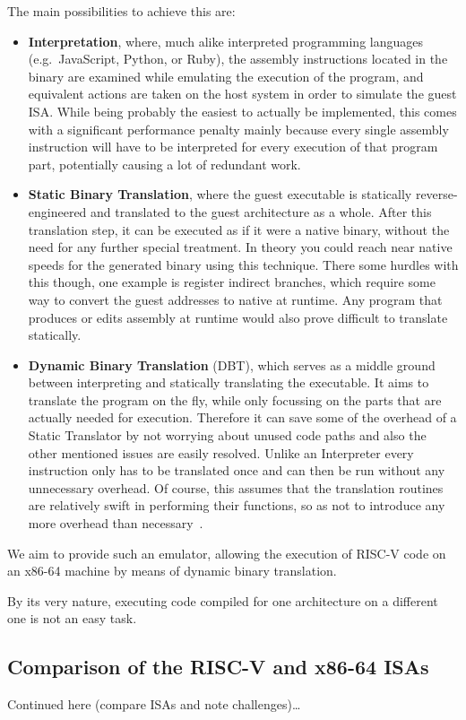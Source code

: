 The main possibilities to achieve this are:
\begin{itemize}
    \item \textbf{Interpretation}, where, much alike interpreted programming languages (e.g.\ JavaScript, Python, or Ruby), the assembly instructions located in the binary are examined while emulating the execution of the program, and equivalent actions are taken on the host system in order to simulate the guest ISA\@.
        \subitem While being probably the easiest to actually be implemented, this comes with a significant performance penalty mainly because every single assembly instruction will have to be interpreted for every execution of that program part, potentially causing a lot of redundant work.
    \item \textbf{Static Binary Translation}, where the guest executable is statically reverse-engineered and translated to the guest architecture as a whole.
    After this translation step, it can be executed as if it were a native binary, without the need for any further special treatment.
    In theory you could reach near native speeds for the generated binary using this technique.
    There some hurdles with this though, one example is register indirect branches, which require some way to convert the guest addresses to native at runtime.
    Any program that produces or edits assembly at runtime would also prove difficult to translate statically.
    \item \textbf{Dynamic Binary Translation} (DBT), which serves as a middle ground between interpreting and statically translating the executable.
    It aims to translate the program on the fly, while only focussing on the parts that are actually needed for execution.
    Therefore it can save some of the overhead of a Static Translator by not worrying about unused code paths and also the other mentioned issues are easily resolved.
    Unlike an Interpreter every instruction only has to be translated once and can then be run without any unnecessary overhead.
    Of course, this assumes that the translation routines are relatively swift in performing their functions, so as not to introduce any more overhead than necessary~\cite[S. 1f.]{bintrans}.
\end{itemize}

We aim to provide such an emulator, allowing the execution of RISC-V code on an x86-64 machine by means of dynamic binary translation.

By its very nature, executing code compiled for one architecture on a different one is not an easy task.


\subsection{Comparison of the RISC-V and x86-64 ISAs}
\label{sec:isa-cmp}

Continued here (compare ISAs and note challenges)\ldots













